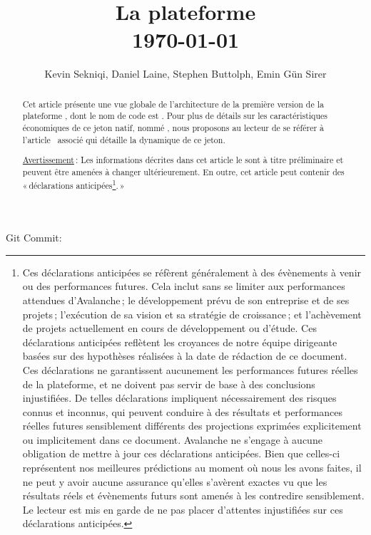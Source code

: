 \documentclass[runningheads,francais,a4paper]{llncs}
\begin{document}
\immediate{}

\title{La plateforme \AVAPlatformName{}\\\today}
\author{Kevin Sekniqi, Daniel Laine, Stephen Buttolph, Emin G{\"u}n Sirer}
\institute{}

\maketitle

\begin{abstract}
Cet article présente une vue globale de l'architecture de la première version de la plateforme \AVAPlatformName{}, dont
le nom de code est \AVAPlatformNameFirstRelease{}. Pour plus de détails sur les caractéristiques économiques de ce
jeton natif, nommé \AVATokenName{}, nous proposons au lecteur de se référer à l'article~\cite{avatokenpaper} associé qui
détaille la dynamique de ce jeton.

\underline{Avertissement}\,: Les informations décrites dans cet article le sont à titre préliminaire et peuvent être
amenées à changer ultérieurement. En outre, cet article peut contenir des «\,déclarations 
anticipées\footnote{Ces déclarations anticipées se réfèrent généralement à des évènements à venir ou des performances futures.
Cela inclut sans se limiter aux performances attendues d'Avalanche\,; le développement prévu de son entreprise et
de ses projets\,; l'exécution de sa vision et sa stratégie de croissance\,; et l'achèvement de projets actuellement en
cours de développement ou d'étude. Ces déclarations anticipées reflètent les croyances de notre équipe dirigeante
basées sur des hypothèses réalisées à la date de rédaction de ce document. Ces déclarations ne garantissent aucunement
les performances futures réelles de la plateforme, et ne doivent pas servir de base à des conclusions injustifiées. De
telles déclarations impliquent nécessairement des risques connus et inconnus, qui peuvent conduire à des résultats et
performances réelles futures sensiblement différents des projections exprimées explicitement ou implicitement dans ce
document. Avalanche ne s'engage à aucune obligation de mettre à jour ces déclarations anticipées. Bien que celles-ci
représentent nos meilleures prédictions au moment où nous les avons faites, il ne peut y avoir aucune assurance qu'elles
s'avèrent exactes vu que les résultats réels et évènements futurs sont amenés à les contredire sensiblement. Le lecteur
est mis en garde de ne pas placer d'attentes injustifiées sur ces déclarations anticipées.}.\,»

\end{abstract}
\begin{center}
    \scriptsize Git Commit: 
 \end{center}
\end{document}
